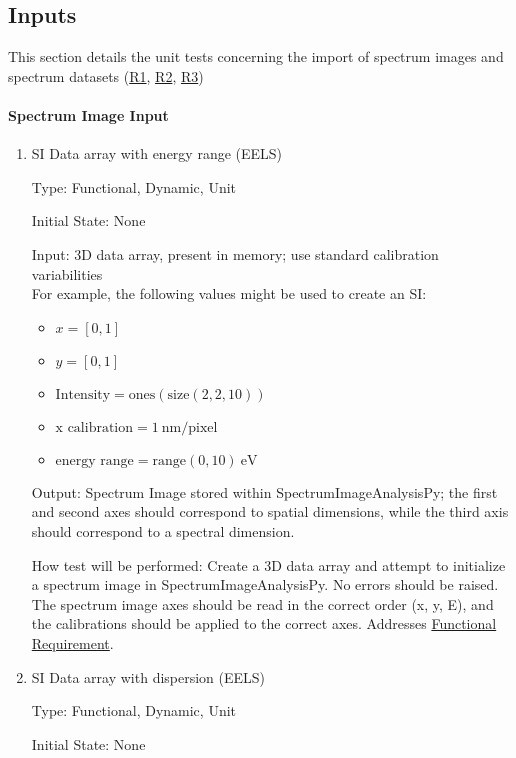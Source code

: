 \documentclass[12pt, titlepage]{article}
\newcommand{\progname}{SpectrumImageAnalysisPy}
\begin{document}
\subsection{Inputs}
This section details the unit tests concerning the import of spectrum images and
spectrum datasets (\hyperref[R_SI_inputs]{R1}, \hyperref[R_spectrum_inputs]{R2},
\hyperref[R_Input_dimension]{R3})
\paragraph{Spectrum Image Input}

\begin{enumerate}

\item{SI Data array with energy range (EELS)}

Type: Functional, Dynamic, Unit

Initial State: None

Input: 3D data array, present in memory; use standard calibration
variabilities\\
For example, the following values might be used to create an SI: 
\begin{itemize}
	\item $x = [0, 1]$
	\item $y = [0, 1]$
	\item $\text{Intensity} = \text{ones}(\text{size}(2,2,10))$
	\item $\text{x calibration} = 1\ \si{\nano\metre}/\text{pixel}$
	\item $\text{energy range} = \text{range}(0, 10)\ \si{\electronvolt}$
\end{itemize}

Output: Spectrum Image stored within \progname{}; the first and second axes
should correspond to spatial dimensions, while the third axis should correspond
to a spectral dimension.

How test will be performed: Create a 3D data array and attempt to initialize a
spectrum image in \progname{}. No errors should be raised. The spectrum image
axes should be read in the correct order (x, y, E), and the calibrations should
be applied to the correct axes. Addresses \hyperref[R_SI_inputs]{Functional
Requirement}.


\item{SI Data array with dispersion (EELS)}

Type: Functional, Dynamic, Unit

Initial State: None


\end{enumerate}
\end{document}
